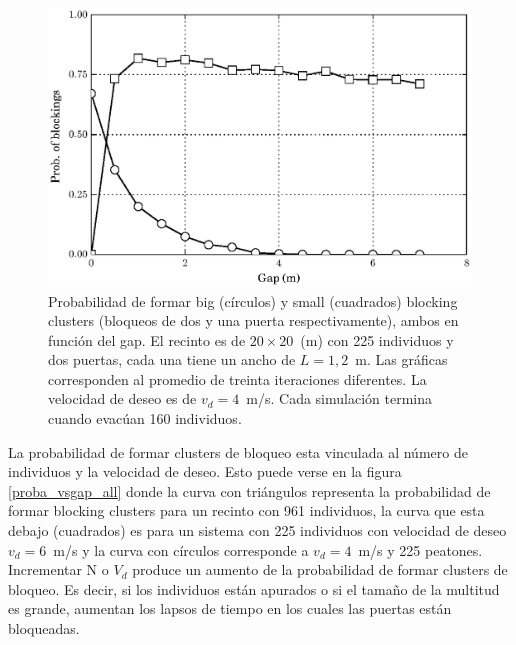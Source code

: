 \begin{figure}[H]
    \centering
    \includegraphics[scale=1.6]{figuras/proba_vsgap_v4_big_small.eps}
    \caption[width=5cm]{Probabilidad de formar big (círculos) y small (cuadrados) blocking clusters (bloqueos de dos y una puerta respectivamente), ambos en función del gap. El recinto es de $20\times 20$~(m) con 225 individuos y dos puertas, cada una tiene un ancho de $L=1,2$~m. Las gráficas corresponden al promedio de treinta iteraciones diferentes. La velocidad de deseo es de $v_d=4$~m/s. Cada simulación termina cuando evacúan 160 individuos.}
    \label{proba_vsgap_v4_big_small}
\end{figure}

La probabilidad de formar clusters de bloqueo esta vinculada al número de individuos y la velocidad de deseo. Esto puede verse en la figura \ref{proba_vsgap_all} donde la curva con triángulos representa la probabilidad de formar blocking clusters para un recinto con 961 individuos, la curva que esta debajo (cuadrados) es para un sistema con 225 individuos con velocidad de deseo $v_d=6$~m/s y la curva con círculos corresponde a $v_d=4$~m/s y 225 peatones. Incrementar N o $V_d$ produce un aumento de la probabilidad de formar clusters de bloqueo. Es decir, si los individuos están apurados o si el tamaño de la multitud es grande, aumentan los lapsos de tiempo en los cuales las puertas están bloqueadas.  

